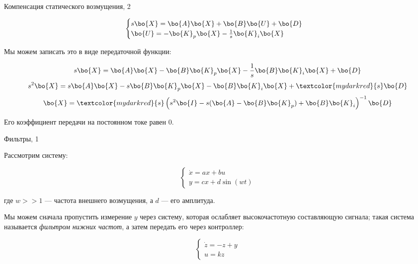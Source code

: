 \documentclass{beamer}
\begin{document}
\begin{frame}{Компенсация статического возмущения, 2}
	\begin{flushleft}
		
		\begin{equation}
			\begin{cases}
				s \bo{X} = \bo{A} \bo{X} + \bo{B} \bo{U} + \bo{D} \\
				\bo{U} = -\bo{K}_p\bo{X} -\frac{1}{s}\bo{K}_i \bo{X}
			\end{cases}
		\end{equation}
		
		Мы можем записать это в виде передаточной функции:
		
		\begin{equation}
			s \bo{X} = \bo{A} \bo{X} -\bo{B}\bo{K}_p\bo{X} -\frac{1}{s}\bo{B}\bo{K}_i \bo{X} + \bo{D}
		\end{equation}
		\begin{equation}
			s^2 \bo{X} = s\bo{A} \bo{X} -s\bo{B}\bo{K}_p\bo{X} -\bo{B}\bo{K}_i \bo{X} + \textcolor{mydarkred}{s} \bo{D}
		\end{equation}
		\begin{equation}
			\bo{X} = \textcolor{mydarkred}{s}
			\left(
			s^2 \bo{I} - s(\bo{A} - \bo{B}\bo{K}_p) + \bo{B}\bo{K}_i 
			\right)^{-1}
			\bo{D}
		\end{equation}
		
		Его коэффициент передачи на постоянном токе равен 0.
		
		
	\end{flushleft}
\end{frame}

\begin{frame}{Фильтры, 1}
	\begin{flushleft}
		
		Рассмотрим систему:
		
		\begin{equation}
			\begin{cases}
				\dot{ x }  = 
				ax+bu
				\\
				y = c x + d \sin(wt)
			\end{cases}
		\end{equation}
		
		где $w >>1$ — частота внешнего возмущения, а $d$ — его амплитуда.
		
		\bigskip
		
		Мы можем сначала пропустить измерение $y$ через систему, которая ослабляет высокочастотную составляющую сигнала; такая система называется \emph{фильтром нижних частот}, а затем передать его через контроллер:
		
		\begin{equation}
			\begin{cases}
				\dot{ z }  = 
				-z+y
				\\
				u = k z
			\end{cases}
		\end{equation}
		
		
	\end{flushleft}
\end{frame}
\end{document}
